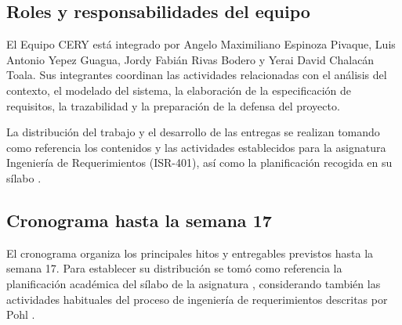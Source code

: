\documentclass[11pt,a4paper]{article}
\begin{document}
\subsection{Roles y responsabilidades del equipo}

El Equipo CERY está integrado por Angelo Maximiliano Espinoza Pivaque, Luis Antonio Yepez Guagua, Jordy Fabián Rivas Bodero y Yerai David Chalacán Toala. Sus integrantes coordinan las actividades relacionadas con el análisis del contexto, el modelado del sistema, la elaboración de la especificación de requisitos, la trazabilidad y la preparación de la defensa del proyecto.

La distribución del trabajo y el desarrollo de las entregas se realizan tomando como referencia los contenidos y las actividades establecidos para la asignatura Ingeniería de Requerimientos (ISR-401), así como la planificación recogida en su sílabo \cite{silabo_isr401}.

\subsection{Cronograma hasta la semana 17}

El cronograma organiza los principales hitos y entregables previstos hasta la semana 17. Para establecer su distribución se tomó como referencia la planificación académica del sílabo de la asignatura \cite{silabo_isr401}, considerando también las actividades habituales del proceso de ingeniería de requerimientos descritas por Pohl \cite{pohl2015requirements}.

\end{document}
